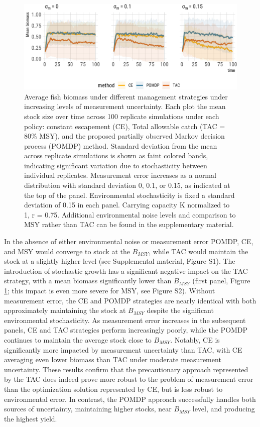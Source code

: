 \documentclass[3p]{elsarticle} %
\makeatletter
\def\maxwidth{\ifdim\Gin@nat@width>\linewidth\linewidth
\else\Gin@nat@width\fi}
\let\Oldincludegraphics\includegraphics
\renewcommand{\includegraphics}[1]{\Oldincludegraphics[width=\maxwidth]{#1}}
\makeatother
\begin{document}
\begin{figure}
\centering
\includegraphics{manuscript_files/figure-latex/sims-1.pdf}
\caption{Average fish biomass under different management strategies
under increasing levels of measurement uncertainty. Each plot the mean
stock size over time across 100 replicate simulations under each policy:
constant escapement (CE), Total allowable catch (TAC = 80\% MSY), and
the proposed partially observed Markov decision process (POMDP) method.
Standard deviation from the mean across replicate simulations is shown
as faint colored bands, indicating significant variation due to
stochasticity between individual replicates. Measurement error increases
as a normal distribution with standard deviation 0, 0.1, or 0.15, as
indicated at the top of the panel. Environmental stochasticity is fixed
a standard deviation of 0.15 in each panel. Carrying capacity K
normalized to 1, r = 0.75. Additional environmental noise levels and
comparison to MSY rather than TAC can be found in the supplementary
material. \label{sims}}
\end{figure}

In the absence of either environmental noise or measurement error POMDP,
CE, and MSY would converge to stock at the \(B_{MSY}\), while TAC would
maintain the stock at a slightly higher level (see Supplemental
material, Figure S1). The introduction of stochastic growth has a
significant negative impact on the TAC strategy, with a mean biomass
significantly lower than \(B_{MSY}\) (first panel, Figure \ref{sims};
this impact is even more severe for MSY, see Figure S2). Without
measurement error, the CE and POMDP strategies are nearly identical with
both approximately maintaining the stock at \(B_{MSY}\) despite the
significant environmental stochasticity. As measurement error increases
in the subsequent panels, CE and TAC strategies perform increasingly
poorly, while the POMDP continues to maintain the average stock close to
\(B_{MSY}\). Notably, CE is significantly more impacted by measurement
uncertainty than TAC, with CE averaging even lower biomass than TAC
under moderate measurement uncertainty. These results confirm that the
precautionary approach represented by the TAC does indeed prove more
robust to the problem of measurement error than the optimization
solution represented by CE, but is less robust to environmental error.
In contrast, the POMDP approach successfully handles both sources of
uncertainty, maintaining higher stocks, near \(B_{MSY}\) level, and
producing the highest yield.
\end{document}
